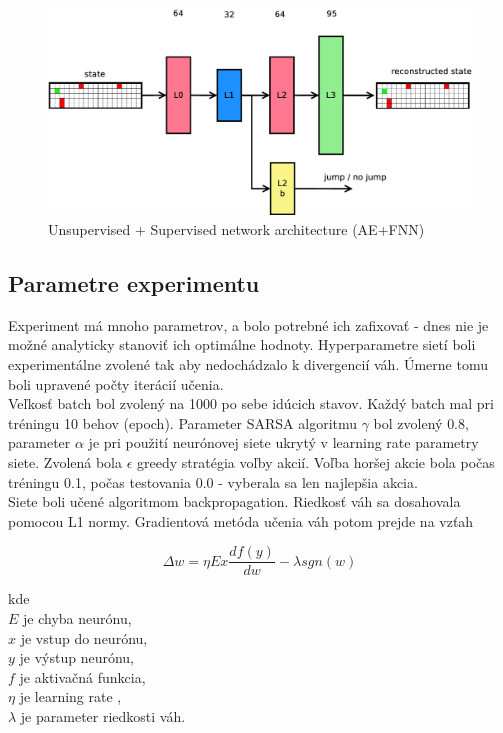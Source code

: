 \documentclass[10pt,a4paper]{article}
\begin{document}
\begin{figure}[!h]
  \centering
  \includegraphics[scale=0.4]{../../diagrams/hnn.png}
  \caption{Unsupervised + Supervised network architecture (AE+FNN)}
  \label{img:Unsupervised + Supervised network architecture}
\end{figure}

\subsection{Parametre experimentu}

Experiment má mnoho parametrov, a bolo potrebné ich zafixovať - dnes nie
je možné analyticky stanoviť ich optimálne hodnoty.
Hyperparametre sietí boli experimentálne zvolené tak aby nedochádzalo k
divergencií váh. Úmerne tomu boli upravené počty iterácií učenia.
\\
Veľkosť batch bol zvolený na 1000 po sebe idúcich stavov. Každý batch mal pri tréningu
10 behov (epoch). Parameter SARSA algoritmu $\gamma$ bol zvolený $0.8$,
parameter $\alpha$ je pri použití neurónovej siete ukrytý v learning rate parametry siete.
Zvolená bola $\epsilon$ greedy stratégia voľby akcií. Voľba horšej akcie bola počas tréningu
0.1, počas testovania 0.0 - vyberala sa len najlepšia akcia.
\\
Siete boli učené algoritmom backpropagation. Riedkosť váh sa dosahovala pomocou L1 normy.
Gradientová metóda učenia váh potom prejde na vzťah

\begin{equation}
  \label{eq:weights_training}
  \Delta w = \eta E x \frac{df(y)}{dw} - \lambda sgn(w)
\end{equation}

kde \\
$E$ je chyba neurónu, \\
$x$ je vstup do neurónu, \\
$y$ je výstup neurónu, \\
$f$ je aktivačná funkcia, \\
$\eta$ je learning rate , \\
$\lambda$ je parameter riedkosti váh.
\end{document}
